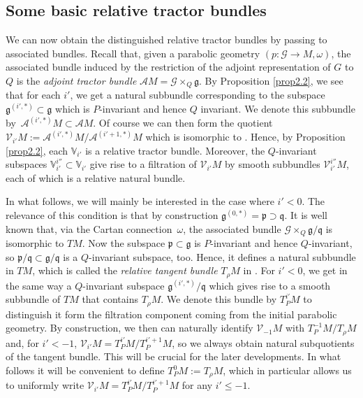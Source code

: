 \documentclass[10pt,a4paper]{amsart}
\numberwithin{equation}{section}
\def\frak{\mathfrak}
\def\Bbb{\mathbb}
\def\Cal{\mathcal}
\newcommand{\x}{\times}
\newcommand{\om}{\omega}
\begin{document}
\subsection{Some basic relative tractor bundles}\label{2.3}
We can now obtain the distinguished relative tractor bundles by passing to associated
bundles. Recall that, given a parabolic geometry $(p\colon \Cal G\to M,\om)$, the
associated bundle induced by the restriction of the adjoint representation of $G$ to
$Q$ is the \textit{adjoint tractor bundle} $\Cal AM=\Cal G\x_Q\frak g$. By
Proposition \ref{prop2.2}, we see that for each $i'$, we get a natural subbundle
corresponding to the subspace $\frak g^{(i',*)}\subset\frak g$ which is $P$-invariant
and hence $Q$ invariant. We denote this subbundle by~$\Cal A^{(i',*)}M\subset\Cal
AM$. Of course we can then form the quotient $\Cal V_{i'}M:=\Cal A^{(i',*)}M/\Cal
A^{(i'+1,*)}M$ which is isomorphic to \smash{$\Cal G\x_Q\bigl(\frak g^{(i',*)}/\frak
 g^{(i'+1,*)}\bigr)=\Cal G\x_Q\Bbb V_{i'}$}. Hence, by Proposition \ref{prop2.2}, each
$\Bbb V_{i'}$ is a relative tractor bundle. Moreover, the $Q$-invariant subspaces
$\Bbb V_{i'}^{i''}\subset\Bbb V_{i'}$ give rise to a filtration of $\Cal V_{i'}M$ by
smooth subbundles $\Cal V_{i'}^{i''}M$, each of which is a relative natural bundle.

In what follows, we will mainly be interested in the case where $i'<0$. The relevance
of this condition is that by construction $\frak g^{(0,*)}=\frak p\supset\frak q$. It
is well known that, via the Cartan connection~$\om$, the associated bundle $\Cal
G\x_Q\frak g/\frak q$ is isomorphic to $TM$. Now the subspace $\frak p\subset\frak g$
is $P$-invariant and hence $Q$-invariant, so $\frak p/\frak q\subset\frak g/\frak q$
is a $Q$-invariant subspace, too. Hence, it defines a natural subbundle in $TM$, which
is called the \textit{relative tangent bundle} $T_\rho M$ in \cite{Rel-BGG2}. For
$i'<0$, we get in the same way a $Q$-invariant subspace $\frak g^{(i',*)}/\frak q$
which gives rise to a smooth subbundle of $TM$ that contains $T_\rho M$. We denote
this bundle by $T^{i'}_P M$ to distinguish it form the filtration component coming
from the initial parabolic geometry. By construction, we then can naturally identify
$\Cal V_{-1}M$ with $T^{-1}_PM/T_\rho M$ and, for $i'<-1$, $\Cal
V_{i'}M=T^{i'}_PM/T^{i'+1}_PM$, so we always obtain natural subquotients of the
tangent bundle. This will be crucial for the later developments. In what follows it
will be convenient to define $T^0_PM:=T_\rho M$, which in particular allows us to
uniformly write $\Cal V_{i'}M=T^{i'}_PM/T^{i'+1}_PM$ for any $i'\leq -1$.
\end{document}
